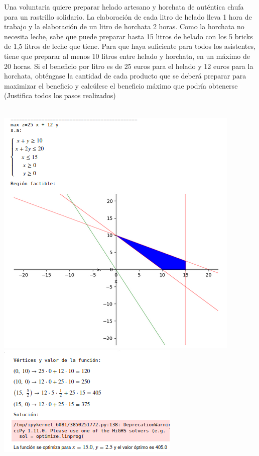 \documentclass[addpoints,spanish, 12pt,a4paper]{exam}
\begin{document}
\begin{questions}
\question[3] Una voluntaria quiere preparar helado artesano y horchata de
auténtica chufa para un rastrillo solidario. La elaboración de cada litro de helado lleva 1 hora
de trabajo y la elaboración de un litro de horchata 2 horas. Como la horchata no necesita leche,
sabe que puede preparar hasta 15 litros de helado con los 5 bricks de 1,5 litros de leche que tiene. Para que haya suficiente
para todos los asistentes, tiene que preparar al menos 10 litros entre helado y horchata, en un
máximo de 20 horas. Si el beneficio por litro es de 25 euros para el helado y 12 euros para la horchata, obténgase
la cantidad de cada producto que se deberá preparar para maximizar el beneficio y calcúlese
el beneficio máximo que podría obtenerse (Justifica todos los pasos realizados)
\begin{solution}\\
\includegraphics[scale=0.5]{prglin3}\\
\includegraphics[scale=0.8]{prglin4}
\end{solution}


\end{questions}
\end{document}
